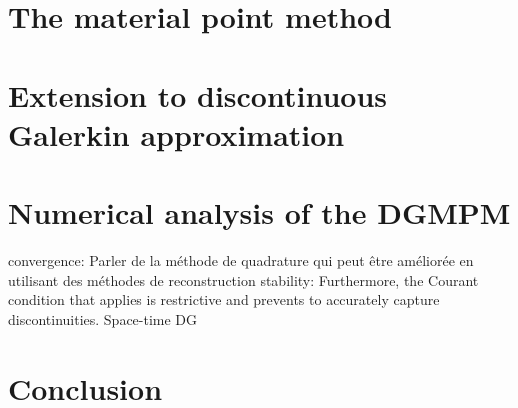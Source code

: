 \section{The material point method}
\label{sec:MPM}


\section{Extension to discontinuous Galerkin approximation}
\label{sec:DGMPM}


\section{Numerical analysis of the DGMPM}
\label{sec:DGMPM_analysis}


convergence: Parler de la méthode de quadrature qui peut être améliorée en utilisant des méthodes de  reconstruction \cite{BsplineMPM}\cite{MPM_BSpline1}
stability: Furthermore, the Courant condition that applies is restrictive \cite{Cockburn} and prevents to accurately capture discontinuities. Space-time DG



\section*{Conclusion}

